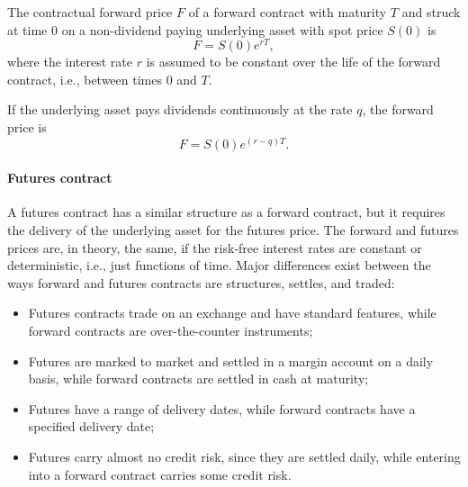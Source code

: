 The contractual forward price $ F $ of a forward contract with maturity $ T $
    and struck at time 0 on a non-dividend paying underlying asset with spot
    price $ S(0) $ is
\begin{equation*}
    F = S(0) e^{rT},
\end{equation*}
where the interest rate $ r $ is assumed to be constant over the life of the
    forward contract, i.e., between times 0 and $ T $.

If the underlying asset pays dividends continuously at the rate $ q $, the
    forward price is
\begin{equation*}
    F = S(0) e^{(r - q) T}.
\end{equation*}

\paragraph{Futures contract}
A futures contract has a similar structure as a forward contract, but it
    requires the delivery of the underlying asset for the futures price.
The forward and futures prices are, in theory, the same, if the risk-free
    interest rates are constant or deterministic, i.e., just functions of time.
Major differences exist between the ways forward and futures contracts are
    structures, settles, and traded:
\begin{itemize}
    \item Futures contracts trade on an exchange and have standard features,
        while forward contracts are over-the-counter instruments;
    \item Futures are marked to market and settled in a margin account on a
        daily basis, while forward contracts are settled in cash at maturity;
    \item Futures have a range of delivery dates, while forward contracts have
        a specified delivery date;
    \item Futures carry almost no credit risk, since they are settled daily,
        while entering into a forward contract carries some credit risk.
\end{itemize}
